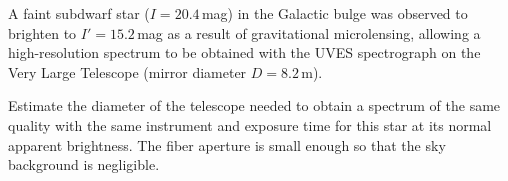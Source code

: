A faint subdwarf star ($I = 20.4$\,mag) in the Galactic bulge was observed to
brighten to $I' = 15.2$\,mag as a result of gravitational microlensing,
allowing a high-resolution spectrum to be obtained with the UVES spectrograph
on the Very Large Telescope (mirror diameter $D = 8.2$\,m).

Estimate the diameter of the telescope needed to obtain a spectrum of the
same quality with the same instrument and exposure time for this star at its
normal apparent brightness. The fiber aperture is small enough so that the
sky background is negligible.
